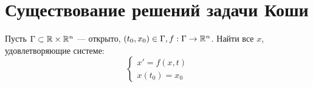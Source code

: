

\section{Существование решений задачи Коши}
\begin{problem}[Коши]
    Пусть \(\Gamma \subset \mathbb{R} \times \mathbb{R}^n\) --- открыто, \((t_0, x_0) \in \Gamma, f: \Gamma \rightarrow \mathbb{R}^n\).
    Найти все \(x\), удовлетворяющие системе:
    \begin{equation}
        \begin{cases}
            x' = f(x, t) \\
            x(t_0) = x_0
        \end{cases}
    \end{equation}
\end{problem}

